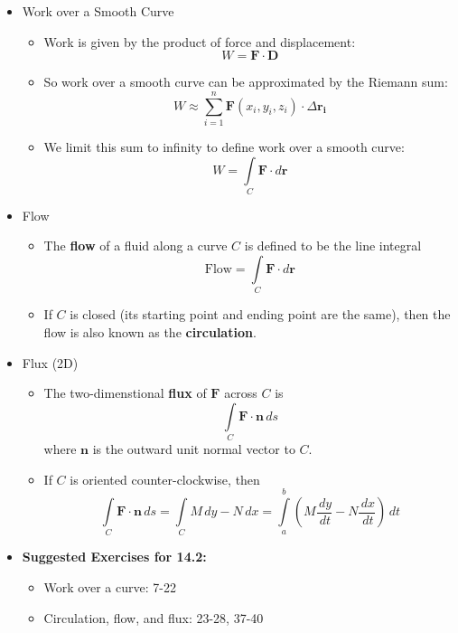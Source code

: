 \documentclass[12pt]{article}
\renewcommand{\vec}[1]{\mathbf{#1}}
\newcommand{\dvar}[1]{\,d{#1}}
\newcommand{\<}{\left<}
\renewcommand{\>}{\right>}
\begin{document}
\begin{itemize}
  \item Work over a Smooth Curve
  
    \begin{itemize}
    \item Work is given by the product of force and displacement: \[W = \vec{F} \cdot \vec{D}\]
    \item So work over a smooth curve can be approximated by the Riemann sum: \[W \approx \sum_{i=1}^n \vec{F}(x_i,y_i,z_i)\cdot\Delta\vec{r_i}\]
    \item We limit this sum to infinity to define work over a smooth curve: \[W = \int\limits_C \vec{F}\cdot d\vec{r}\]
    \end{itemize}
    
  \item Flow
  
    \begin{itemize}
    \item The \textbf{flow} of a fluid along a curve $C$ is defined to be the line integral \[\textrm{Flow} = \int\limits_C \vec{F}\cdot d\vec{r} \]
    \item If $C$ is closed (its starting point and ending point are the same), then the flow is also known as the \textbf{circulation}.
    \end{itemize}
    
  \newpage
    
  \item Flux (2D)
  
    \begin{itemize}
    \item The two-dimenstional \textbf{flux} of $\vec{F}$ across $C$ is \[\int\limits_C \vec{F}\cdot\vec{n}\,ds\] where $\vec{n}$ is the outward unit normal vector to $C$.
    \item If $C$ is oriented counter-clockwise, then 
      \[
        \int\limits_C \vec{F}\cdot\vec{n}\dvar{s} = \int\limits_C M\dvar{y} - N\dvar{x} = \int\limits_{a}^{b} \left(M\frac{\dvar{y}}{\dvar{t}}-N\frac{\dvar{x}}{\dvar{t}}\right)\dvar{t}
      \]
    \end{itemize}
        
  \item \textbf{Suggested Exercises for 14.2:}
  
    \begin{itemize}
    \item Work over a curve: 7-22
    \item Circulation, flow, and flux: 23-28, 37-40
    \end{itemize}
    
  \end{itemize}
  
\end{document}
